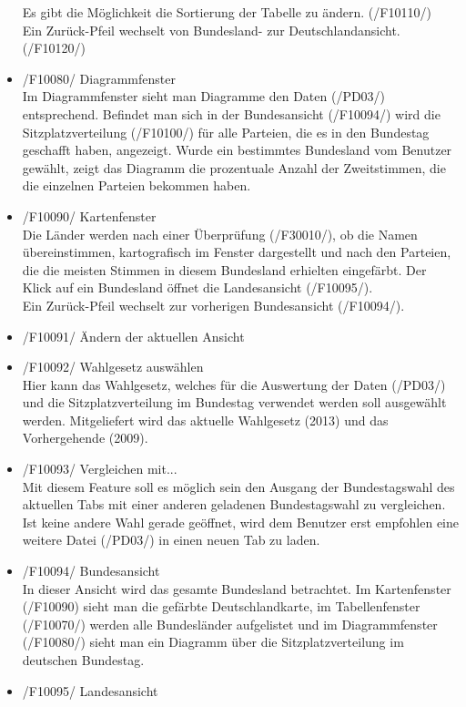 \documentclass[10pt,a4paper]{article}
\begin{document}
\begin{itemize}
	Es gibt die Möglichkeit die Sortierung der Tabelle zu ändern. (/F10110/) \\
	Ein Zurück-Pfeil wechselt von Bundesland- zur Deutschlandansicht. (/F10120/)
	\item /F10080/ Diagrammfenster \hfill \\
	Im Diagrammfenster sieht man Diagramme den Daten (/PD03/) entsprechend. Befindet man sich in der Bundesansicht (/F10094/) wird die Sitzplatzverteilung (/F10100/) für alle Parteien, die es in den Bundestag geschafft haben, angezeigt. Wurde ein bestimmtes Bundesland vom Benutzer gewählt, zeigt das Diagramm die prozentuale Anzahl der Zweitstimmen, die die einzelnen Parteien bekommen haben.
	\item /F10090/ Kartenfenster \hfill \\
	Die Länder werden nach einer Überprüfung (/F30010/), ob die Namen übereinstimmen, kartografisch im Fenster dargestellt und nach den Parteien, die die meisten Stimmen in diesem Bundesland erhielten eingefärbt. Der Klick auf ein Bundesland öffnet die Landesansicht (/F10095/). \\
	Ein Zurück-Pfeil wechselt zur vorherigen Bundesansicht (/F10094/).
	\item /F10091/ Ändern der aktuellen Ansicht \hfill \\
	\item /F10092/ Wahlgesetz auswählen \hfill \\
	Hier kann das Wahlgesetz, welches für die Auswertung der Daten (/PD03/) und die Sitzplatzverteilung im Bundestag verwendet werden soll ausgewählt werden. Mitgeliefert wird das aktuelle Wahlgesetz (2013) und das Vorhergehende (2009).
	\item /F10093/ Vergleichen mit... \hfill \\
	Mit diesem Feature soll es möglich sein den Ausgang der Bundestagswahl des aktuellen Tabs mit einer anderen geladenen Bundestagswahl zu vergleichen. Ist keine andere Wahl gerade geöffnet, wird dem Benutzer erst empfohlen eine weitere Datei (/PD03/) in einen neuen Tab zu laden.
	\item /F10094/ Bundesansicht \hfill \\
	In dieser Ansicht wird das gesamte Bundesland betrachtet. Im Kartenfenster (/F10090) sieht man die gefärbte Deutschlandkarte, im Tabellenfenster (/F10070/) werden alle Bundesländer aufgelistet und im Diagrammfenster (/F10080/) sieht man ein Diagramm über die Sitzplatzverteilung im deutschen Bundestag.
	\item /F10095/ Landesansicht \hfill \\

\end{itemize}
\end{document}
